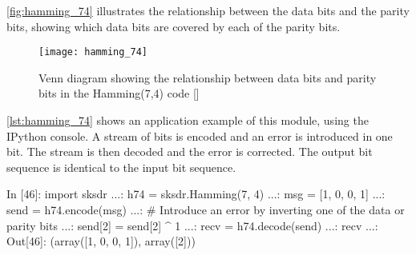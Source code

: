 \autoref{fig:hamming_74} illustrates the relationship between the data bits and the parity bits, showing which data bits are covered by each of the parity bits.

\begin{figure}[H]
  \centering
  \texttt{[image: hamming\_74]}
  \caption{Venn diagram showing the relationship between data bits and parity bits in the Hamming(7,4) code [\citeauthor{image:hamming74_venn_diagram}]}
  \label{fig:hamming_74}
\end{figure}

\autoref{lst:hamming_74} shows an application example of this module, using the IPython console. A stream of bits is encoded and an error is introduced in one bit. The stream is then decoded and the error is corrected. The output bit sequence is identical to the input bit sequence.

\begin{python}[label={lst:hamming_74},caption={Hamming(7,4) example}]
In [46]: import sksdr
  ...: h74 = sksdr.Hamming(7, 4)
  ...: msg = [1, 0, 0, 1]
  ...: send = h74.encode(msg)
  ...: # Introduce an error by inverting one of the data or parity bits
  ...: send[2] = send[2] ^ 1
  ...: recv = h74.decode(send)
  ...: recv
  ...:
Out[46]: (array([1, 0, 0, 1]), array([2]))
\end{python}
